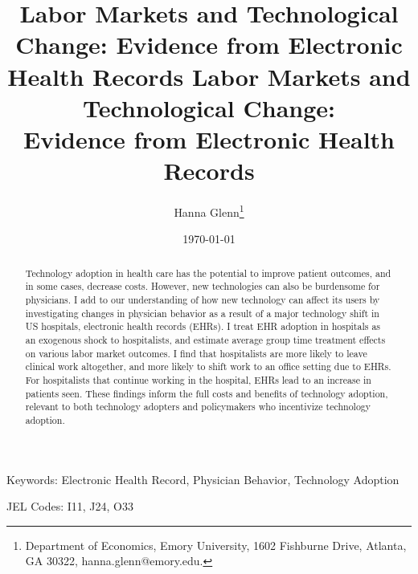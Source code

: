 \documentclass[12pt]{article}
\title{Labor Markets and Technological Change: Evidence from Electronic Health Records}
\begin{document}
\linespread{1.2}\title{\vspace{-0.5in} Labor Markets and Technological Change: \\ \Large Evidence from Electronic Health Records} 
	
	\date{\today}
	
	\author{\vspace{10mm}Hanna Glenn\footnote{Department of Economics, Emory University, 1602 Fishburne Drive, Atlanta, GA 30322, hanna.glenn@emory.edu.} }
	
	\maketitle
	
	\vspace{-0.2in}
	
	\singlespacing\maketitle

\begin{abstract}\small
    Technology adoption in health care has the potential to improve patient outcomes, and in some cases, decrease costs. However, new technologies can also be burdensome for physicians. I add to our understanding of how new technology can affect its users by investigating changes in physician behavior as a result of a major technology shift in US hospitals, electronic health records (EHRs). I treat EHR adoption in hospitals as an exogenous shock to hospitalists, and estimate average group time treatment effects on various labor market outcomes. I find that hospitalists are more likely to leave clinical work altogether, and more likely to shift work to an office setting due to EHRs. For hospitalists that continue working in the hospital, EHRs lead to an increase in patients seen. These findings inform the full costs and benefits of technology adoption, relevant to both technology adopters and policymakers who incentivize technology adoption.
\end{abstract}

\vspace{2in}
	
	\noindent Keywords: Electronic Health Record, Physician Behavior, Technology Adoption

    \vspace{2mm}
	
	\noindent JEL Codes: I11, J24, O33
	
\end{document}
